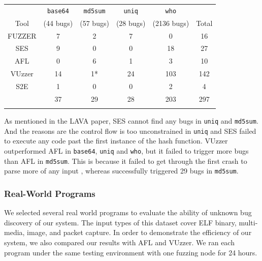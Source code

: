 \begin{table}[!b]
{\begin{tabular*}{20pc}{@{\extracolsep{\fill}}cccccc@{}}\toprule
	     & \texttt{base64} & \texttt{md5sum} & \texttt{uniq} & \texttt{who} &   \\
	     Tool    & (44 bugs) & (57 bugs) & (28 bugs) & (2136 bugs) &  Total\\
\midrule
		FUZZER 		& 7  & 2  & 7    & 0   & 16  \\
		SES	        & 9  & 0  & 0    & 18  & 27  \\
		AFL         & 0  & 6  & 1    & 3   & 10   \\
		VUzzer		& 14 & 1* & 24   & 103  & 142 \\
		S2E         & 1  & 0  & 0    & 2   & 4   \\
		\prototype	& 37 & 29 & 28   & 203 & 297 \\
\botrule
\end{tabular*}}{}
\end{table}

As mentioned in the LAVA paper, SES cannot find any bugs in \texttt{uniq} and 
\texttt{md5sum}. And the reasons are the control flow is too unconstrained in 
\texttt{uniq} and SES failed to execute any code past the first instance of 
the hash function. 
VUzzer outperformed AFL in \texttt{base64}, \texttt{uniq} and \texttt{who}, 
but it failed to trigger more bugs than AFL in \texttt{md5sum}. 
This is because it failed to get through the first crash to parse more of any input \cite{rawat2017vuzzer}, whereas \prototype successfully triggered 29 bugs in 
\texttt{md5sum}.

\subsubsection{Real-World Programs}
We selected several real world programs to evaluate the ability of unknown bug 
discovery of our system. The input types of this dataset cover ELF binary, 
multi-media, image, and packet capture. In order to demonstrate the efficiency 
of our system, we also compared our results with AFL and VUzzer. We ran each
 program under the same testing environment with one fuzzing node for 24 hours. 

